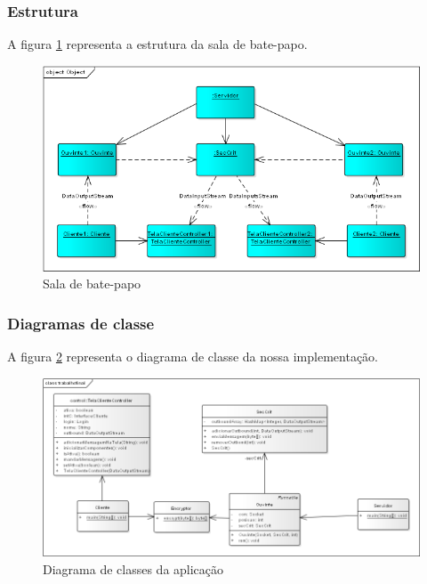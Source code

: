 \documentclass[a4paper,12pt]{article}
\begin{document}
\subsubsection{Estrutura}
A figura \ref{fig1} representa a estrutura da sala de bate-papo.
\begin{figure}[H]
	\centering
	\includegraphics[scale=0.4]{img/objectdiagram.png}    
	\caption{Sala de bate-papo}
	\label{fig1}     
	\end{figure} 
\subsubsection{Diagramas de classe}
A figura \ref{fig2} representa o diagrama de classe da nossa implementação.
\begin{figure}[H]
	\centering
\includegraphics[scale=0.3]{img/class.png}    
\caption{Diagrama de classes da aplicação}

\label{fig2}
\end{figure} 
\end{document}
